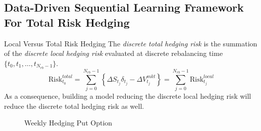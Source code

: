 \documentclass[10pt,table,mathserif]{beamer}
\newcommand{\Vmkt}{V^{mkt}}
\newcommand{\Smkt}{S}
\begin{document}
\subsection{Data-Driven Sequential Learning Framework For Total Risk Hedging}
\begin{frame}{Local Versus Total Risk Hedging}
The {\em discrete total hedging risk} is the summation of the {\em discrete local hedging risk} evaluated at discrete rebalancing time $\{t_0,t_1,\dots,t_{N_{rb}-1}\}$. 
\[
    \text{Risk}^{total}_{t_0}=\sum_{j=0}^{N_{rb}-1}\left\{ \Delta \Smkt_{t_j} \delta_{t_j} -\Delta \Vmkt_{t_j} \right\}=\sum_{j=0}^{N_{rb}-1}\text{Risk}^{local}_{t_j}
\]
As a consequence, building a model reducing the discrete local hedging risk will reduce the discrete total hedging risk as well. 
\begin{figure}[htp!]
	\centering
\caption{Weekly Hedging Put Option}
\end{figure}
\end{frame}
\end{document}

